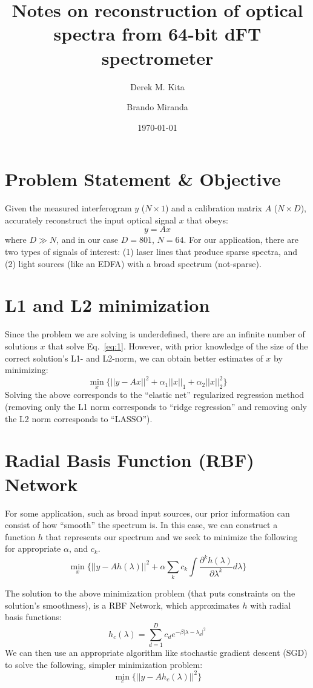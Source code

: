 \documentclass[10pt,a4paper]{article}
\title{Notes on reconstruction of optical spectra from 64-bit dFT spectrometer}
\author[1]{Derek M. Kita}
\author[2]{Brando Miranda}
\affil[1]{Department of Materials Science \& Engineering, Massachusetts Institute of Technology}
\affil[2]{Center for Brains, Minds, and Machines, Massachusetts Institute of Technology}
\date{\today}
\begin{document}
\maketitle

\section*{Problem Statement \& Objective}
Given the measured interferogram $y$ ($N\times 1$) and a calibration matrix $A$ ($N\times D$), accurately reconstruct the input optical signal $x$ that obeys:
\begin{equation}
y = Ax \label{eq:1}
\end{equation}
where $D\gg N$, and in our case $D=801$, $N=64$.  For our application, there are two types of signals of interest: (1) laser lines that produce sparse spectra, and (2) light sources (like an EDFA) with a broad spectrum (not-sparse).

\section*{L1 and L2 minimization}
Since the problem we are solving is underdefined, there are an infinite number of solutions $x$ that solve Eq.~\ref{eq:1}. However, with prior knowledge of the size of the correct solution's L1- and L2-norm, we can obtain better estimates of $x$ by minimizing:
\begin{equation}
\min_x \Big\{ ||y-Ax||^2 + \alpha_1 ||x||_1 + \alpha_2 ||x||_2^2 \Big\}
\end{equation}
Solving the above corresponds to the ``elastic net'' regularized regression method (removing only the L1 norm corresponds to ``ridge regression'' and removing only the L2 norm corresponds to ``LASSO'').

\section*{Radial Basis Function (RBF) Network}
For some application, such as broad input sources, our prior information can consist of how ``smooth'' the spectrum is.  In this case, we can construct a function $h$ that represents our spectrum and we seek to minimize the following for appropriate $\alpha$, and $c_k$.
\begin{equation}
\min_x \Big\{ ||y-A h(\lambda)||^2 + \alpha \sum_k c_k \int \frac{\partial^k h(\lambda)}{\partial \lambda^k}d\lambda \Big\}
\end{equation}

The solution to the above minimization problem (that puts constraints on the solution's smoothness), is a RBF Network, which approximates $h$ with radial basis functions:
\begin{equation}
h_c(\lambda) = \sum_{d=1}^D c_d e^{-\beta |\lambda - \lambda_d|^2}
\end{equation}
We can then use an appropriate algorithm like stochastic gradient descent (SGD) to solve the following, simpler minimization problem:
\begin{equation}
\min_c \Big\{ ||y-Ah_c(\lambda)||^2\Big\}
\end{equation}
\end{document}
